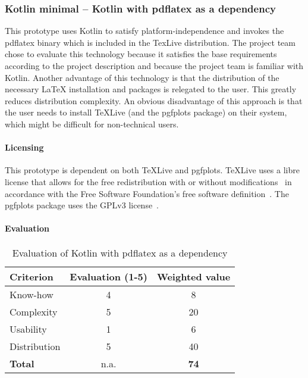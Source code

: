 \subsubsection{Kotlin minimal – Kotlin with pdflatex as a dependency}\label{subsubsec:kotlin_minimal}
This prototype uses Kotlin to satisfy platform-independence and invokes the pdflatex binary which is included in the TexLive distribution.
The project team chose to evaluate this technology because it satisfies the base requirements according to the project description and because
the project team is familiar with Kotlin.
Another advantage of this technology is that the distribution of the necessary LaTeX installation and packages is relegated to the user.
This greatly reduces distribution complexity.\newline
An obvious disadvantage of this approach is that the user needs to install TeXLive (and the pgfplots package) on their system, which might be difficult for non-technical users.

\paragraph{Licensing}
This prototype is dependent on both TeXLive and pgfplots.
TeXLive uses a libre license that allows for the free redistribution with or without modifications~\cite{texlive_license} in accordance with the Free Software Foundation's free software definition~\cite{fsf_free_software}.
The pgfplots package uses the GPLv3 license~\cite{pgfplots}.

\paragraph{Evaluation}
\begin{table}[H]
    \centering
    \begin{tabular}{l c c}
        \toprule
        \textbf{Criterion} & \textbf{Evaluation (1{-}5)} & \textbf{Weighted value} \\
        \midrule
        Know-how           & 4                           & 8                       \\
        \midrule
        Complexity         & 5                           & 20                      \\
        \midrule
        Usability          & 1                           & 6                       \\
        \midrule
        Distribution       & 5                           & 40                      \\
        \midrule
        \textbf{Total}     & n.a.                        & \textbf{74}             \\
        \bottomrule
    \end{tabular}
    \caption{Evaluation of Kotlin with pdflatex as a dependency}\label{table:kotlin_minimal_evaluation}
\end{table}

